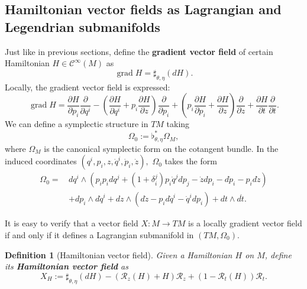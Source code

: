 \documentclass[12pt]{article}
\newtheorem{Def}{Definition}[section]
\newcommand{\grad}{\operatorname{grad}}
\newcommand{\partder}[2]{\frac{\partial #1}{\partial #2}}
\begin{document}
\subsection[Hamiltonian vector fields as Lagrangian submanifolds]{Hamiltonian vector fields as Lagrangian and Legendrian submanifolds}

Just like in previous sections, define the \textbf{gradient vector field} of certain Hamiltonian $H\in \mathcal{C}^\infty(M)$ as $$ \grad H = \sharp_{\theta, \eta}(dH).$$ Locally, the gradient vector field is expressed: $$\grad H = \partder{H}{p_i} \partder{}{q^i} - \left (\partder{H}{q^i} + p_i\partder{H}{z} \right) \partder{}{p_i} + \left( p_i \partder{H}{p_i} + \partder{H}{z}\right ) \partder{}{z} + \partder{H}{t} \partder{}{t}.$$ We can define a symplectic structure in $TM$ taking $$\Omega_0 := \flat_{\theta, \eta} ^* \Omega_M,$$ where $\Omega_M$ is the canonical symplectic form on the cotangent bundle. In the induced coordinates $(q^i, p_i, z, \dot{q}^i, \dot{p}_i, \dot{z}),$ $\Omega_0$ takes the form 
\begin{align*}
    \Omega_0 = \,& dq^i \wedge \left (p_ip_i dq^j + (1 + \delta_i^j)p_i \dot{q}^j dp_j - \dot{z} dp_i - d\dot{p}_i - p_i d\dot{z}\right) \\
     & + dp_i \wedge d\dot{q}^i  + dz \wedge \left( d\dot{z} - p_id\dot{q}^i - \dot{q}^i dp_i\right) + dt \wedge d\dot{t}.
\end{align*}

It is easy to verify that a vector field $X: M \rightarrow TM$ is a locally gradient vector field if and only if it defines a Lagrangian submanifold in $(TM , \Omega_0).$\\

\begin{Def}[Hamiltonian vector field] Given a Hamiltonian $H$ on $M$, define its \textbf{Hamiltonian vector field} as $$X_H:= \sharp_{\theta, \eta}(dH) - (\mathcal{R}_z(H) + H) \mathcal{R}_z + (1 - \mathcal{R}_t(H)) \mathcal{R}_t.$$
\end{Def}
\end{document}

